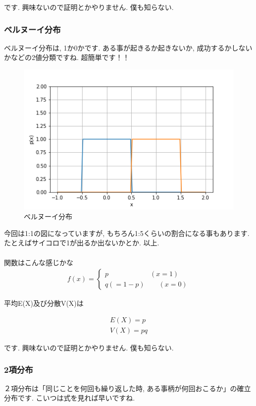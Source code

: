 \documentclass[11pt,a4paper]{jreport}
\begin{document}
です. 興味ないので証明とかやりません. 僕も知らない.
\subsubsection{ベルヌーイ分布}
ベルヌーイ分布は, 1か0かです. ある事が起きるか起きないか, 成功するかしないかなどの2値分類ですね. 超簡単です！！\\

\begin{figure}[H]
\label{im:bernoulli}
  \centering
  \includegraphics[width=120mm,bb=0 0 432 288]{figures/bernoulli.png}
  \caption{ベルヌーイ分布}
\end{figure}
今回は1:1の図になっていますが, もちろん1:5くらいの割合になる事もあります. たとえばサイコロで1が出るか出ないかとか. 以上.\\
\\
関数はこんな感じかな
\begin{eqnarray}
f(x)=
  \left\{
    \begin{array}{l}
      p \qquad \qquad \qquad (x = 1) \\
      q(=1-p)  \qquad (x=0)
    \end{array}
  \right.
\end{eqnarray}

平均E(X)及び分散V(X)は

\begin{eqnarray}
E(X) = p\\
V(X) = pq
\end{eqnarray}

です. 興味ないので証明とかやりません. 僕も知らない.
\subsubsection{2項分布}
２項分布は「同じことを何回も繰り返した時, ある事柄が何回おこるか」の確立分布です. こいつは式を見れば早いですね.
\end{document}

